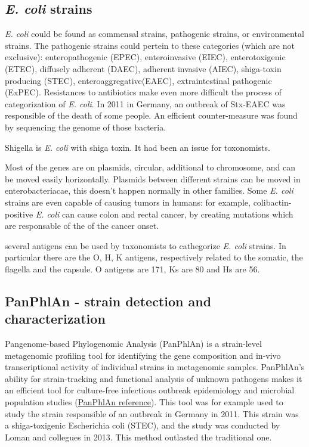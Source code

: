 \subsection{\emph{E. coli} strains}
\emph{E. coli} could be found as commensal strains, pathogenic strains, or environmental strains. The pathogenic strains could pertein to these categories (which are not exclusive): enteropathogenic (EPEC), enteroinvasive (EIEC), enterotoxigenic (ETEC), diffusely adherent (DAEC), adherent invasive (AIEC), shiga-toxin producing (STEC), enteroaggregative(EAEC), extraintestinal pathogenic (ExPEC). Resistances to antibiotics make even more difficult the process of categorization of \emph{E. coli}.
In 2011 in Germany, an outbreak of Stx-EAEC was responsible of the death of some people. An efficient counter-measure was found by sequencing the genome of those bacteria.

Shigella is \emph{E. coli} with shiga toxin. It had been an issue for toxonomists.

Most of the genes are on plasmids, circular, additional to chromosome, and can be moved easily horizontally. Plasmids between different strains can be moved in enterobacteriacae, this doesn't happen normally in other families.
Some \emph{E. coli} strains are even capable of causing tumors in humans: for example, colibactin-positive \emph{\emph{E. coli}} can cause colon and rectal cancer, by creating mutations which are responsable of the of the cancer onset.

several antigens can be used by taxonomists to cathegorize \emph{E. coli} strains. In particular there are the O, H, K antigens, respectively related to the somatic, the flagella and the capsule. O antigens are 171, Ks are 80 and Hs are 56.

\subsection{PanPhlAn - strain detection and characterization}

Pangenome-based Phylogenomic Analysis (PanPhlAn) is a strain-level metagenomic profiling tool
for identifying the gene composition and in-vivo transcriptional activity of individual strains in metagenomic samples. PanPhlAn’s ability for strain-tracking and functional analysis of unknown pathogens makes it an efficient tool for culture-free infectious outbreak epidemiology and microbial population studies (\href{http://segatalab.cibio.unitn.it/tools/panphlan/}{PanPhlAn reference}). This tool was for example used to study the strain responsible of an outbreak in Germany in 2011. This strain was a shiga-toxigenic Escherichia coli (STEC), and the study was conducted by Loman and collegues in 2013.
This method outlasted the traditional one.


